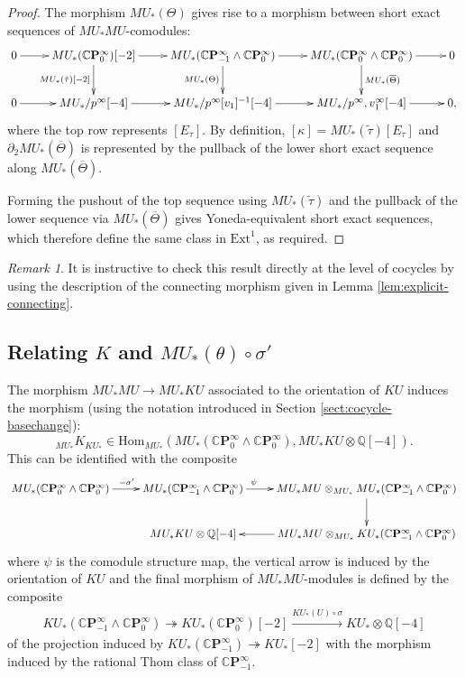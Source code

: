 \documentclass[10pt,a4paper]{amsart}
\theoremstyle{definition}
\theoremstyle{remark}
\newtheorem{rem}[thm]{Remark}
\renewcommand{\hom}{\mathrm{Hom}}
\newcommand{\ext}{\mathrm{Ext}}
\newcommand{\rat}{\mathbb{Q}}
\newcommand{\cp}{\mathbb{C} \mathbf{P}^\infty}
\renewcommand{\smash}{\wedge}
\begin{document}
\begin{proof}
The morphism $MU_* (\Theta)$ gives rise to a morphism between short exact sequences of $MU_*MU$-comodules:
\[
\xymatrix{
0
\ar[r]
&
MU_* (\cp_0)[-2]
\ar[d]_{MU_* (\tilde{\tau}) [-2]}
\ar[r]
&
MU_* (\cp_{-1} \smash \cp_0)
\ar[r]
\ar[d]_{MU_* (\Theta)}
&
MU_* (\cp_0 \smash \cp_0)
\ar[d]^{MU_* (\overline{\Theta}) }
\ar[r]
&
0
\\
0
\ar[r]
&
MU_*/p^\infty[-4]
\ar[r]
&
MU_* /p^\infty [v_1]^{-1}[-4]
\ar[r]
&
MU_* /p^\infty , v_1 ^\infty [-4]
\ar[r]
&
0,
}
\]
where the top row represents $[E_\tau]$. By definition, $[\kappa] = MU_* (\tilde{\tau}) [E_\tau]$ and $\partial _2 MU_* (\overline{\Theta})$ is represented by the pullback of the lower short exact sequence along $MU_* (\overline{\Theta})$.

Forming the pushout of the top sequence using $MU_* (\tilde{\tau}) $ and the pullback of the lower
sequence via $MU_* (\overline{\Theta})$ gives Yoneda-equivalent short exact sequences,  which therefore define the same
class in $\ext^1$, as required.
\end{proof}

\begin{rem}
	It is instructive to check this result directly at the level of cocycles by using the description of the connecting morphism given in Lemma \ref{lem:explicit-connecting}.
\end{rem}




\subsection{Relating $K$ and $MU_*(\theta) \circ \sigma'$}
\label{subsect:relate_K_MuTheta}


The morphism $MU_*MU \rightarrow MU_* KU$ associated to the
orientation of $KU$ induces the morphism (using the notation introduced in Section \ref{sect:cocycle-basechange}):
\[
 _{MU_*} K _{KU_*} \in \hom_{MU_*} (MU_* (\cp_0\smash \cp_0), MU_*KU \otimes
\rat [-4]).
\]
This can be identified with the composite
\[
 \xymatrix{
MU_* (\cp_0 \smash \cp_0)
\ar[r]^{- \sigma'}
&
MU_* (\cp_{-1} \smash \cp_0)
\ar[r]^(.35){\psi}
&
MU_*MU \otimes_{MU_*}
MU_* (\cp_{-1} \smash \cp_0)
\ar[d]
\\
&
MU_* KU \otimes \rat[-4]
&
MU_*MU \otimes_{MU_*}
KU_* (\cp_{-1} \smash \cp_0)
\ar[l],
}
\]
where $\psi$ is the comodule structure map, the vertical arrow is induced by the orientation of $KU$ and the final
morphism of $MU_*MU$-modules is defined by the composite
\begin{eqnarray}
\label{eqn:KU_thom_sigma}
 KU_* (\cp_{-1} \smash \cp_0)
\twoheadrightarrow
KU_* (\cp_0) [-2]
\stackrel{KU_*(U) \circ \sigma}{\longrightarrow}
KU_* \otimes \rat [-4]
\end{eqnarray}
of the projection induced by $KU_* (\cp_{-1}) \twoheadrightarrow KU_* [-2]$ with the morphism induced by the rational
Thom class of $\cp_{-1}$.
\end{document}

